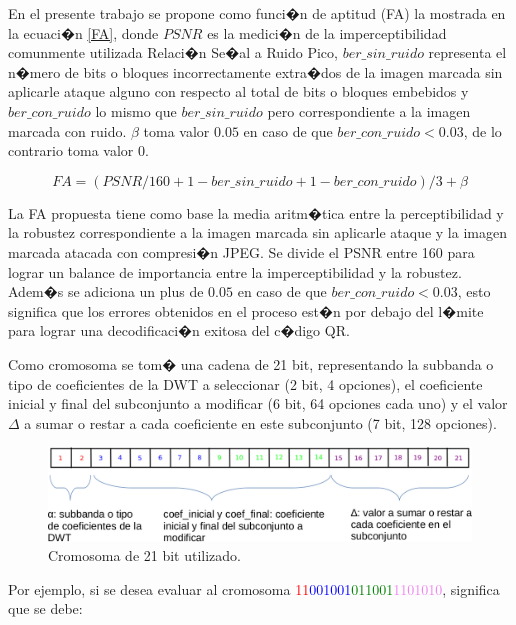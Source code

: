 \documentclass{rcci} %
\begin{document}
En el presente trabajo se propone como funci�n de aptitud (FA) la mostrada en la ecuaci�n \ref{FA}, donde $PSNR$ es la medici�n de la imperceptibilidad comunmente utilizada Relaci�n Se�al a Ruido Pico,
$ber\_sin\_ruido$ representa el n�mero de bits o bloques incorrectamente extra�dos de la imagen marcada
sin aplicarle ataque alguno con respecto al total de bits o bloques embebidos y $ber\_con\_ruido$ lo mismo
que  $ber\_sin\_ruido$ pero correspondiente a la imagen marcada con ruido. $\beta$ toma valor $0.05$ en caso de
que $ber\_con\_ruido < 0.03$, de lo contrario toma valor $0$.

\begin{equation}
FA = (PSNR/160 + 1 - ber\_sin\_ruido + 1 - ber\_con\_ruido)/3 + \beta
\label{FA}
\end{equation}

La FA propuesta tiene como base la media aritm�tica entre la perceptibilidad y la robustez correspondiente a la imagen marcada sin aplicarle ataque y la imagen marcada atacada con compresi�n JPEG. Se divide el PSNR entre 160 para lograr un balance de importancia entre la imperceptibilidad y la robustez. Adem�s se adiciona un plus de $0.05$ en caso de que $ber\_con\_ruido < 0.03$, esto significa que los errores obtenidos en el proceso est�n por debajo del l�mite para lograr una decodificaci�n exitosa del c�digo QR.

Como cromosoma se tom� una cadena de 21 bit, representando la subbanda o tipo de coeficientes de la DWT
a seleccionar (2 bit, 4 opciones), el coeficiente inicial y final del subconjunto a modificar (6 bit, 64 opciones cada uno) y el valor $\Delta$ a sumar o restar a cada coeficiente en este subconjunto (7 bit, 128 opciones).

\begin{figure}[H]	%
	\centering
	\includegraphics[width=13cm]{cromosoma} %
	\caption{Cromosoma de 21 bit utilizado.}
	\label{cromosoma}
\end{figure}

Por ejemplo, si se desea evaluar al cromosoma \textcolor{red}{11}\textcolor{blue}{001001}\textcolor{green}{011001}\textcolor{violet}{1101010}, significa que se debe:
\end{document}
